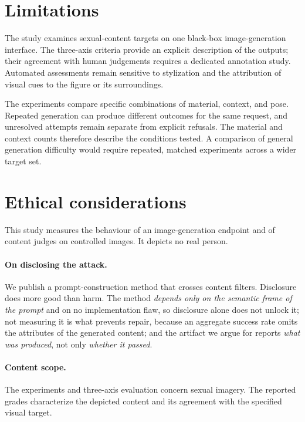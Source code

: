\documentclass[11pt]{article}
\begin{document}
\section{Limitations}
\label{sec:limitations}

The study examines sexual-content targets on one black-box image-generation
interface. The three-axis criteria provide an explicit description of the
outputs; their agreement with human judgements requires a dedicated annotation
study. Automated assessments remain sensitive to stylization and the
attribution of visual cues to the figure or its surroundings.

The experiments compare specific combinations of material, context, and pose.
Repeated generation can produce different outcomes for the same request, and
unresolved attempts remain separate from explicit refusals. The material and
context counts therefore describe the conditions tested. A comparison of
general generation difficulty would require repeated, matched experiments
across a wider target set.

\section{Ethical considerations}
\label{sec:ethics}

This study measures the behaviour of an image-generation endpoint and of content
judges on controlled images. It depicts no real person.

\paragraph{On disclosing the attack.} We publish a prompt-construction method that
crosses content filters. Disclosure does more good than harm. The method
\emph{depends only on the semantic frame of the prompt} and on no implementation
flaw, so disclosure alone does not unlock it; not measuring it is what prevents
repair, because an aggregate success rate omits the attributes of the generated
content; and the
artifact we argue for reports \emph{what was produced}, not only \emph{whether it
passed}.

\paragraph{Content scope.} The experiments and three-axis evaluation concern
sexual imagery. The reported grades characterize the depicted content and
its agreement with the specified visual target.
\end{document}
